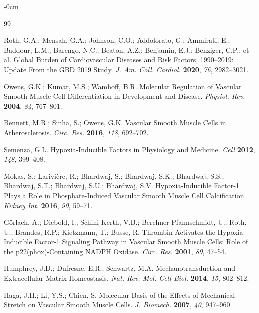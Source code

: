 \documentclass[materials,article,submit,moreauthors,pdftex]{Definitions/mdpi}
\begin{document}
\begin{adjustwidth}{-\extralength}{0cm}


\begin{thebibliography}{99}

Roth, G.A.; Mensah, G.A.; Johnson, C.O.; Addolorato, G.; Ammirati, E.; Baddour, L.M.; Barengo, N.C.; Beaton, A.Z.; Benjamin, E.J.; Benziger, C.P.; et al. Global Burden of Cardiovascular Diseases and Risk Factors, 1990–2019: Update From the GBD 2019 Study. \textit{J. Am. Coll. Cardiol.} \textbf{2020}, \textit{76}, 2982–3021.

Owens, G.K.; Kumar, M.S.; Wamhoff, B.R. Molecular Regulation of Vascular Smooth Muscle Cell Differentiation in Development and Disease. \textit{Physiol. Rev.} \textbf{2004}, \textit{84}, 767–801.

Bennett, M.R.; Sinha, S.; Owens, G.K. Vascular Smooth Muscle Cells in Atherosclerosis. \textit{Circ. Res.} \textbf{2016}, \textit{118}, 692–702.

Semenza, G.L. Hypoxia-Inducible Factors in Physiology and Medicine. \textit{Cell} \textbf{2012}, \textit{148}, 399–408.

Mokas, S.; Larivière, R.; Bhardwaj, S.; Bhardwaj, S.K.; Bhardwaj, S.S.; Bhardwaj, S.T.; Bhardwaj, S.U.; Bhardwaj, S.V. Hypoxia-Inducible Factor-1 Plays a Role in Phosphate-Induced Vascular Smooth Muscle Cell Calcification. \textit{Kidney Int.} \textbf{2016}, \textit{90}, 59–71.

Görlach, A.; Diebold, I.; Schini-Kerth, V.B.; Berchner-Pfannschmidt, U.; Roth, U.; Brandes, R.P.; Kietzmann, T.; Busse, R. Thrombin Activates the Hypoxia-Inducible Factor-1 Signaling Pathway in Vascular Smooth Muscle Cells: Role of the p22(phox)-Containing NADPH Oxidase. \textit{Circ. Res.} \textbf{2001}, \textit{89}, 47–54.

Humphrey, J.D.; Dufresne, E.R.; Schwartz, M.A. Mechanotransduction and Extracellular Matrix Homeostasis. \textit{Nat. Rev. Mol. Cell Biol.} \textbf{2014}, \textit{15}, 802–812.

Haga, J.H.; Li, Y.S.; Chien, S. Molecular Basis of the Effects of Mechanical Stretch on Vascular Smooth Muscle Cells. \textit{J. Biomech.} \textbf{2007}, \textit{40}, 947–960.


\end{thebibliography}
\end{adjustwidth}
\end{document}
